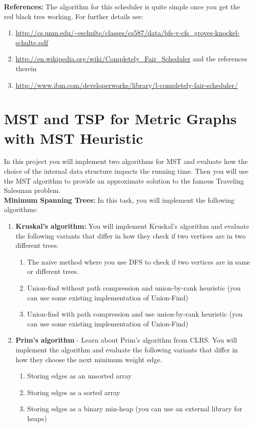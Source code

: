 \documentclass[12pt]{article}
\begin{document}
{\bf References:}
The algorithm for this scheduler is quite simple once you get the red black tree working. For further details see:
\begin{enumerate}
\item {\small \url{http://cs.unm.edu/~eschulte/classes/cs587/data/bfs-v-cfs_groves-knockel-schulte.pdf}}
\item \url{http://en.wikipedia.org/wiki/Completely_Fair_Scheduler} and the references therein
\item \url{http://www.ibm.com/developerworks/library/l-completely-fair-scheduler/}
\end{enumerate}


\section{MST and TSP for Metric Graphs with MST Heuristic}

In this project you will implement two algorithms for MST and evaluate how the choice of the internal data structure impacts the running time. Then you will use the MST algorithm to provide an approximate solution to the famous Traveling Salesman problem. \\

{\bf Minimum Spanning Trees:} In this task, you will implement the following algorithms:
\begin{enumerate}
\item {\bf Kruskal's algorithm:} You will implement Kruskal's algorithm and evaluate the following variants that differ in how they check if two vertices are in two different trees. 
\begin{enumerate}
\item The naive method where you use DFS to check if two vertices are in same or different trees.
\item Union-find without path compression and union-by-rank heuristic (you can use some existing implementation of Union-Find)
\item Union-find with path compression and use union-by-rank heuristic (you can use some existing implementation of Union-Find)
\end{enumerate}
\item {\bf Prim's algorithm} - Learn about Prim's algorithm from CLRS. You will implement the algorithm and evaluate the following variants that differ in how they choose the next minimum weight edge.
\begin{enumerate}
\item Storing edges as an unsorted array
\item Storing edges as a sorted array
\item Storing edges as a binary min-heap (you can use an external library for heaps)
\end{enumerate}
\end{enumerate}
\end{document}
